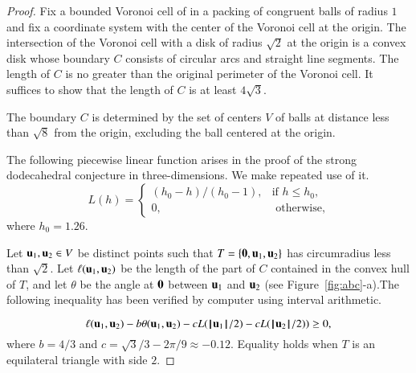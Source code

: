 \documentclass{llncs}
\begin{document}
\begin{proof} Fix a bounded Voronoi cell of in a packing of congruent
  balls of radius $1$ and fix a coordinate system with the center of
  the Voronoi cell at the origin.  The intersection of the Voronoi
  cell with a disk of radius $\sqrt2$ at the origin is a convex disk
  whose boundary $C$ consists of circular arcs and straight line
  segments.  The length of $C$ is no greater than the original
  perimeter of the Voronoi cell.  It suffices to show that the length
  of $C$ is at least $4\sqrt{3}$.



The boundary $C$ is determined by the set of centers $V$ of balls at
distance less than $\sqrt8$ from the origin, excluding the ball
centered at the origin.

The following piecewise linear function arises in the proof of the strong dodecahedral
conjecture in three-dimensions.  We make repeated use of it.
\begin{equation}
L(h) = \begin{cases} 
   (h_0-h)/(h_0-1),& \text{if } h \le h_0,\\
  0,&\text{ otherwise},
 \end{cases}
\end{equation}
where $h_0 = 1.26$. 

Let ${\mathbf u}_1,{\mathbf u}_2\in V$ be distinct points such that
$T=\{{\mathbf 0},{\mathbf u}_1,{\mathbf u}_2\}$ has circumradius less than $\sqrt2$.  Let
$\ell({\mathbf u}_1,{\mathbf u}_2)$ be the length of the part of $C$ contained in the
convex hull of $T$, and let $\theta$ be the angle at ${\mathbf 0}$ between
${\mathbf u}_1$ and ${\mathbf u}_2$ (see Figure~\ref{fig:abc}-a).The following inequality has been verified by
computer using interval arithmetic.





\begin{equation}\label{eqn:ineq} %
\ell(\u_1,\u_2) - b \theta(\u_1,\u_2) - 
c L(\normo{\u_1}/2) - c L(\normo{\u_2}/2)) \ge 0,
\end{equation}
where $b=4/3$ and $c=\sqrt3/3 - 2\pi/9 \approx -0.12$.
Equality holds when $T$ is an equilateral triangle with side $2$.


\end{proof}
\end{document}
